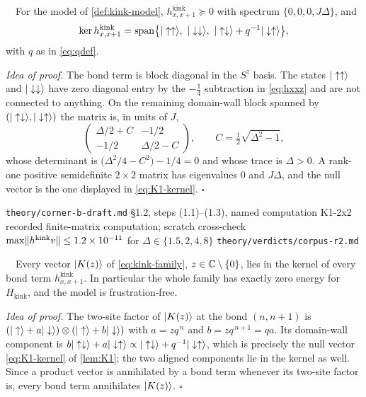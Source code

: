 \begin{lemma}
\label{lem:K1}
\statusProved\ \ For the model of \cref{def:kink-model},
$h^{\mathrm{kink}}_{x,x+1}\succeq0$ with spectrum $\{0,0,0,J\Delta\}$, and
\begin{equation}
  \ker h^{\mathrm{kink}}_{x,x+1}
  =\operatorname{span}\bigl\{\ket{\uparrow\uparrow},\ \ket{\downarrow\downarrow},
  \ \ket{\uparrow\downarrow}+q^{-1}\ket{\downarrow\uparrow}\bigr\},
  \label{eq:K1-kernel}
\end{equation}
with $q$ as in \eqref{eq:qdef}.
\end{lemma}

\noindent\emph{Idea of proof.} The bond term is block diagonal in the $S^z$
basis. The states $|\uparrow\uparrow\rangle$ and $|\downarrow\downarrow\rangle$
have zero diagonal entry by the $-\tfrac14$ subtraction in \eqref{eq:hxxz} and
are not connected to anything. On the remaining domain-wall block spanned by
$(|\uparrow\downarrow\rangle,|\downarrow\uparrow\rangle)$ the matrix is, in units
of $J$,
\begin{equation}
  \begin{pmatrix}\Delta/2+C & -1/2\\[2pt] -1/2 & \Delta/2-C\end{pmatrix},
  \qquad C=\tfrac12\sqrt{\Delta^2-1},
  \label{eq:K1-block}
\end{equation}
whose determinant is $\bigl(\Delta^2/4-C^2\bigr)-1/4=0$ and whose trace is
$\Delta>0$. A rank-one positive semidefinite $2\times2$ matrix has eigenvalues
$0$ and $J\Delta$, and the null vector is the one displayed in
\eqref{eq:K1-kernel}. \hfill$\square$

%
{\texttt{theory/corner-b-draft.md} \S1.2, steps (1.1)--(1.3), named computation
 K1-2x2}%
{recorded finite-matrix computation; scratch cross-check
 $\max\lVert h^{\mathrm{kink}}v\rVert\le1.2\times10^{-11}$ for
 $\Delta\in\{1.5,2,4,8\}$}%
{\texttt{theory/verdicts/corpus-r2.md}}

\begin{lemma}
\label{lem:K2}
\statusProved\ \ Every vector $|K(z)\rangle$ of \eqref{eq:kink-family},
$z\in\mathbb{C}\setminus\{0\}$, lies in the kernel of every bond term
$h^{\mathrm{kink}}_{x,x+1}$. In particular the whole family has exactly zero
energy for $H_{\mathrm{kink}}$, and the model is frustration-free.
\end{lemma}

\noindent\emph{Idea of proof.} The two-site factor of $|K(z)\rangle$ at the bond
$(n,n+1)$ is $(|\uparrow\rangle+a|\downarrow\rangle)\otimes
(|\uparrow\rangle+b|\downarrow\rangle)$ with $a=zq^{\,n}$ and $b=zq^{\,n+1}=qa$.
Its domain-wall component is $b|\uparrow\downarrow\rangle+a|\downarrow\uparrow\rangle
\propto|\uparrow\downarrow\rangle+q^{-1}|\downarrow\uparrow\rangle$, which is
precisely the null vector \eqref{eq:K1-kernel} of \cref{lem:K1}; the two
aligned components lie in the kernel as well. Since a product vector is
annihilated by a bond term whenever its two-site factor is, every bond term
annihilates $|K(z)\rangle$. \hfill$\square$

